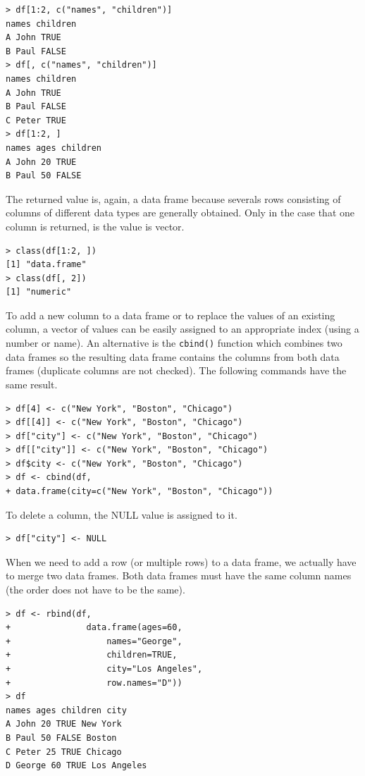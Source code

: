 \begin{verbatim}
> df[1:2, c("names", "children")]
names children
A John TRUE
B Paul FALSE
> df[, c("names", "children")]
names children
A John TRUE
B Paul FALSE
C Peter TRUE
> df[1:2, ]
names ages children
A John 20 TRUE
B Paul 50 FALSE
\end{verbatim}

The returned value is, again, a data frame because severals rows consisting of
columns of different data types are generally obtained. Only in the case that one
column is returned, is the value is vector.

\begin{verbatim}
> class(df[1:2, ])
[1] "data.frame"
> class(df[, 2])
[1] "numeric"
\end{verbatim}

To add a new column to a data frame or to replace the values of an existing
column, a vector of values can be easily assigned to an appropriate index (using
a number or name). An alternative is the \texttt{cbind()} function which combines two
data frames so the resulting data frame contains the columns from both data frames (duplicate columns are not checked). The following commands have the
same result.

\begin{verbatim}
> df[4] <- c("New York", "Boston", "Chicago")
> df[[4]] <- c("New York", "Boston", "Chicago")
> df["city"] <- c("New York", "Boston", "Chicago")
> df[["city"]] <- c("New York", "Boston", "Chicago")
> df$city <- c("New York", "Boston", "Chicago")
> df <- cbind(df,
+ data.frame(city=c("New York", "Boston", "Chicago"))
\end{verbatim}

To delete a column, the NULL value is assigned to it.

\begin{verbatim}
> df["city"] <- NULL
\end{verbatim}

When we need to add a row (or multiple rows) to a data frame, we actually
have to merge two data frames. Both data frames must have the same column
names (the order does not have to be the same).

\begin{verbatim}
> df <- rbind(df,
+               data.frame(ages=60,
+                   names="George",
+                   children=TRUE,
+                   city="Los Angeles",
+                   row.names="D"))
> df
names ages children city
A John 20 TRUE New York
B Paul 50 FALSE Boston
C Peter 25 TRUE Chicago
D George 60 TRUE Los Angeles
\end{verbatim}  

